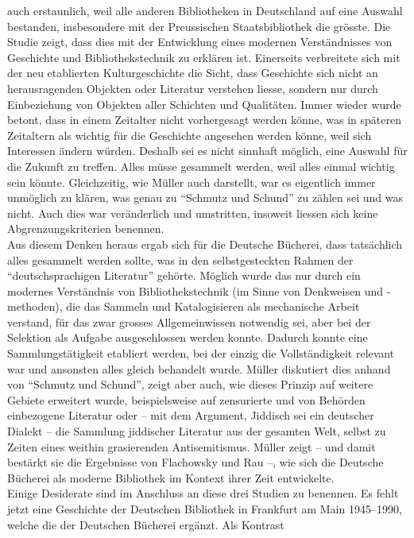 \documentclass[a4paper,
fontsize=11pt,
oneside,
numbers=noperiodatend,
parskip=half-,
bibliography=totoc,
final
]{scrartcl}
\begin{document}
auch erstaunlich, weil alle anderen Bibliotheken in Deutschland auf eine
Auswahl bestanden, insbesondere mit der Preussischen Staatsbibliothek
die grösste. Die Studie zeigt, dass dies mit der Entwicklung eines
modernen Verständnisses von Geschichte und Bibliothekstechnik zu
erklären ist. Einerseits verbreitete sich mit der neu etablierten
Kulturgeschichte die Sicht, dass Geschichte sich nicht an herausragenden
Objekten oder Literatur verstehen liesse, sondern nur durch Einbeziehung
von Objekten aller Schichten und Qualitäten. Immer wieder wurde betont,
dass in einem Zeitalter nicht vorhergesagt werden könne, was in späteren
Zeitaltern als wichtig für die Geschichte angesehen werden könne, weil
sich Interessen ändern würden. Deshalb sei es nicht sinnhaft möglich,
eine Auswahl für die Zukunft zu treffen. Alles müsse gesammelt werden,
weil alles einmal wichtig sein könnte. Gleichzeitig, wie Müller auch
darstellt, war es eigentlich immer unmöglich zu klären, was genau zu
``Schmutz und Schund'' zu zählen sei und was nicht. Auch dies war
veränderlich und umstritten, insoweit liessen sich keine
Abgrenzungskriterien benennen.\\
Aus diesem Denken heraus ergab sich für die Deutsche Bücherei, dass
tatsächlich alles gesammelt werden sollte, was in den selbstgesteckten
Rahmen der ``deutschsprachigen Literatur'' gehörte. Möglich wurde das
nur durch ein modernes Verständnis von Bibliothekstechnik (im Sinne von
Denkweisen und -methoden), die das Sammeln und Katalogisieren als
mechanische Arbeit verstand, für das zwar grosses Allgemeinwissen
notwendig sei, aber bei der Selektion als Aufgabe ausgeschlossen werden
konnte. Dadurch konnte eine Sammlungstätigkeit etabliert werden, bei der
einzig die Vollständigkeit relevant war und ansonsten alles gleich
behandelt wurde. Müller diskutiert dies anhand von ``Schmutz und
Schund'', zeigt aber auch, wie dieses Prinzip auf weitere Gebiete
erweitert wurde, beispielsweise auf zensurierte und von Behörden
einbezogene Literatur oder -- mit dem Argument, Jiddisch sei ein
deutscher Dialekt -- die Sammlung jiddischer Literatur aus der gesamten
Welt, selbst zu Zeiten eines weithin grasierenden Antisemitismus. Müller
zeigt -- und damit bestärkt sie die Ergebnisse von Flachowsky und Rau
--, wie sich die Deutsche Bücherei als moderne Bibliothek im Kontext
ihrer Zeit entwickelte.\\
Einige Desiderate sind im Anschluss an diese drei Studien zu benennen.
Es fehlt jetzt eine Geschichte der Deutschen Bibliothek in Frankfurt am
Main 1945--1990, welche die der Deutschen Bücherei ergänzt. Als Kontrast
\end{document}
